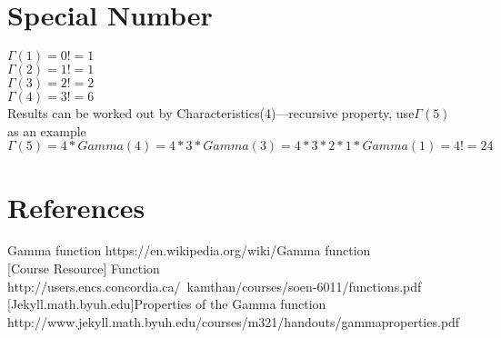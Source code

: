 \documentclass[a4paper, 11pt]{article}
\begin{document}
\section{Special Number}
\indent\indent $\Gamma(1) = 0! = 1$\\
\indent $\Gamma(2) = 1! = 1$ \\
\indent $\Gamma(3) = 2! = 2$ \\
\indent $\Gamma(4) = 3! = 6$ \\
\indent Results can be worked out by Characteristics(4)---recursive property, use$\Gamma(5)$ as an example \\
\indent $\Gamma(5)=4*Gamma(4)=4*3*Gamma(3)=4*3*2*1*Gamma(1)=4!=24$
\section{References}
\indent{} Gamma function https://en.wikipedia.org/wiki/Gamma function\\

[Course Resource] Function http://users.encs.concordia.ca/~kamthan/courses/soen-6011/functions.pdf\\

[Jekyll.math.byuh.edu]Properties of the Gamma function \\
\indent \indent\indent\indent\indent\indent\indent http://www.jekyll.math.byuh.edu/courses/m321/handouts/gammaproperties.pdf
\end{document}
